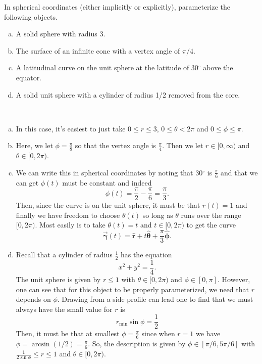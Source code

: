 \documentclass[12pt]{article} %
\newcommand{\curvegamma}{\boldsymbol{\vec{\gamma}}}
\newcommand{\rhat}{\boldsymbol{\hat{r}}}
\newcommand{\thetahat}{\boldsymbol{\hat{\theta}}}
\newcommand{\phihat}{\boldsymbol{\hat{\phi}}}
\begin{document}
\newpage
\begin{problem}
	In spherical coordinates (either implicitly or explicitly), parameterize the following objects.
	\begin{enumerate}[(a)]
		\item A solid sphere with radius 3.
		\item The surface of an infinite cone with a vertex angle of $\pi/4$.
		\item A latitudinal curve on the unit sphere at the latitude of 30$^\circ$ above the equator.
		\item A solid unit sphere with a cylinder of radius 1/2 removed from the core.
	\end{enumerate}
\end{problem}
 \begin{solution} ~
 \begin{enumerate}[(a)]
    \item In this case, it's easiest to just take $0\leq r \leq 3$, $0\leq \theta < 2\pi$ and $0\leq \phi \leq \pi$.  
    \item Here, we let $\phi=\frac{\pi}{8}$ so that the vertex angle is $\frac{\pi}{4}$.  Then we let $r\in [0,\infty)$ and $\theta \in [0,2\pi)$.
    \item We can write this in spherical coordinates by noting that 30$^\circ$ is $\frac{\pi}{6}$ and that we can get $\phi(t)$ must be constant and indeed 
    \[
    \phi(t) = \frac{\pi}{2}-\frac{\pi}{6}=\frac{\pi}{3}.
    \]
    Then, since the curve is on the unit sphere, it must be that $r(t)=1$ and finally we have freedom to choose $\theta(t)$ so long as $\theta$ runs over the range $[0,2\pi)$. Most easily is to take $\theta(t)=t$ and $t\in [0,2\pi)$ to get the curve
    \[
    \curvegamma(t) = \rhat + t \thetahat +\frac{\pi}{3} \phihat.
    \]
    \item Recall that a cylinder of radius $\frac{1}{2}$ has the equation
    \[
    x^2+y^2=\frac{1}{4}.
    \]
    The unit sphere is given by $r\leq 1$ with $\theta \in [0,2\pi)$ and $\phi \in [0,\pi]$. However, one can see that for this object to be properly parameterized, we need that $r$ depends on $\phi$.  Drawing from a side profile can lead one to find that we must always have the small value for $r$ is
    \[
    r_{\textrm{min}} \sin \phi = \frac{1}{2}
    \]
    Then, it must be that at smallest $\phi = \frac{\pi}{6}$ since when $r=1$ we have $\phi = \arcsin(1/2) = \frac{\pi}{6}$.  So, the description is given by $\phi \in [\pi/6, 5\pi/6]$ with $\frac{1}{2\sin \phi} \leq r \leq 1$ and $\theta \in [0,2\pi)$.
 \end{enumerate}
\end{solution}
\end{document}
